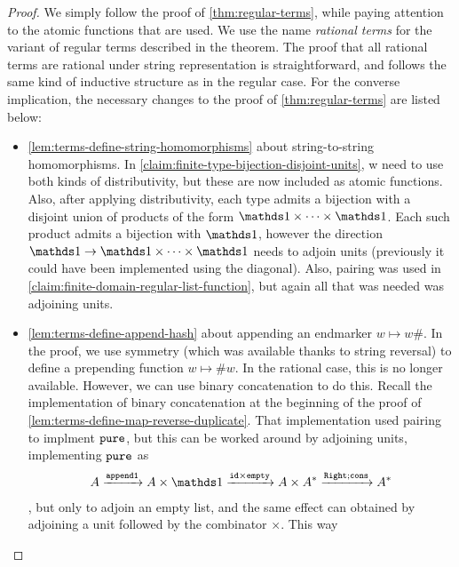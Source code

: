 \begin{proof}
    We simply follow the proof of \cref{thm:regular-terms}, while paying attention to the atomic functions that are used.
    We use the name \emph{rational terms} for the variant of regular terms described in the theorem.   The proof that all rational terms are rational under string representation is straightforward, and follows the same kind of inductive structure as in the regular case.  For the converse implication, the necessary changes to the proof of \cref{thm:regular-terms} are listed below:
    \begin{itemize}
    \item \cref{lem:terms-define-string-homomorphisms}  about string-to-string homomorphisms. In \cref{claim:finite-type-bijection-disjoint-units}, w need to use both kinds of distributivity, but these are now included as atomic functions. Also, after applying distributivity, each type admits a bijection with a disjoint union of products of the form $\onetype \times \cdots \times \onetype$. Each such product admits a bijection with $\onetype$, however the direction $\onetype \to \onetype \times \cdots \times \onetype$ needs to adjoin units (previously it could have been implemented using the diagonal). Also, pairing was used in \cref{claim:finite-domain-regular-list-function}, but again all that was needed was adjoining units.
    \item \cref{lem:terms-define-append-hash} about appending an endmarker $w \mapsto w\#$. In the proof, we use symmetry (which was available thanks to string reversal) to define a prepending function $w \mapsto \#w$. In the rational case, this is no longer available. However, we can use binary concatenation to do this. Recall the implementation of binary concatenation at the beginning of the proof of \cref{lem:terms-define-map-reverse-duplicate}. That implementation used pairing to implment $\mathtt{pure}$, but this can be worked around by adjoining units, implementing $\mathtt{pure}$ as
    \begin{align*}
    A 
    \xrightarrow {\appendoneterm}
    A \times \onetype 
    \xrightarrow {\idterm \times \emptyterm}
    A \times A^* 
    \xrightarrow {\rightterm; \consterm}
    A^*
    \end{align*}
    , but only to adjoin an empty list, and the same effect can obtained by adjoining a unit followed by the combinator $\times$. This way 

\end{itemize}
\end{proof}
